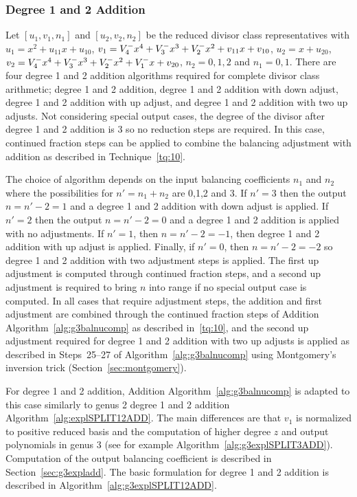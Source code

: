 \subsubsection{Degree 1 and 2 Addition}
Let $[u_1,v_1,n_1]$ and $[u_2,v_2,n_2]$ be the reduced divisor class representatives
with $u_1 = x^2 + u_{11}x + u_{10}$, $v_1 = V^{-}_4x^4 + V^{-}_3x^3 + V^{-}_2x^2 +
v_{11}x + v_{10}$, $u_2 = x + u_{20}$, $v_2 = V^{-}_4x^4 + V^{-}_3x^3 + V^{-}_2x^2 +
V^{-}_1x + v_{20}$, $n_2 = 0,1,2$ and $n_1 = 0,1$. There are four degree 1 and 2
addition algorithms required for complete divisor class arithmetic; degree 1 and
2 addition, degree 1 and 2 addition with down adjust, degree 1 and 2 addition
with up adjust, and degree 1 and 2 addition with two up adjusts. Not considering
special output cases, the degree of the divisor after degree 1 and 2 addition is
3 so no reduction steps are required. In this case, continued fraction steps can
be applied to combine the balancing adjustment with addition as described in
Technique~\ref{tq:10}.

The choice of algorithm depends on the input balancing coefficients $n_1$ and
$n_2$ where the possibilities for $n' =n_1 + n_2$ are 0,1,2 and 3. If $n' = 3$
then the output $n = n'-2 = 1$ and a degree 1 and 2 addition with down adjust is
applied. If $n' = 2$ then the output $n = n'-2 = 0$ and a degree 1 and 2
addition is applied with no adjustments. If $n'=1$, then $n = n' - 2= -1$, then
degree 1 and 2 addition with up adjust is applied. Finally, if $n' = 0$, then $n
= n' - 2 = -2$ so degree 1 and 2 addition with two adjustment steps is applied. The
first up adjustment is computed through continued fraction steps, and a second
up adjustment is required to bring $n$ into range if no special output case is
computed. In all cases that require adjustment steps, the addition and first
adjustment are combined through the continued fraction steps of Addition
Algorithm~\ref{alg:g3balnucomp} as described in~\ref{tq:10}, and the second up
adjustment required for degree 1 and 2 addition with two up adjusts is applied
as described in Steps~25--27 of Algorithm~\ref{alg:g3balnucomp} using
Montgomery's inversion trick (Section~\ref{sec:montgomery}). 


For degree 1 and 2 addition, Addition Algorithm~\ref{alg:g3balnucomp} is adapted
to this case similarly to genus 2 degree 1 and 2 addition
Algorithm~\ref{alg:explSPLIT12ADD}.  The main differences are that $v_1$ is
normalized to positive reduced basis and the computation of higher degree $z$
and output polynomials in genus 3 (see for example
Algorithm~\ref{alg:g3explSPLIT3ADD}).  Computation of the output balancing
coefficient is described in Section~\ref{sec:g3expladd}. The basic formulation
for degree 1 and 2 addition is described in
Algorithm~\ref{alg:g3explSPLIT12ADD}.

